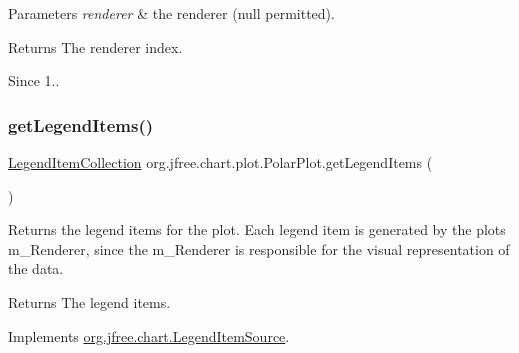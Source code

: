 \begin{DoxyParams}{Parameters}
{\em renderer} & the renderer ({\ttfamily null} permitted).\\
\hline
\end{DoxyParams}
\begin{DoxyReturn}{Returns}
The renderer index.
\end{DoxyReturn}
\begin{DoxySince}{Since}
1.. 
\end{DoxySince}
\mbox{\label{classorg_1_1jfree_1_1chart_1_1plot_1_1_polar_plot_a3581c61aafa174b1f10952d312a2c9d1}} 
\subsubsection{\texorpdfstring{get\+Legend\+Items()}{getLegendItems()}}
{\footnotesize\ttfamily \mbox{\hyperlink{classorg_1_1jfree_1_1chart_1_1_legend_item_collection}{Legend\+Item\+Collection}} org.\+jfree.\+chart.\+plot.\+Polar\+Plot.\+get\+Legend\+Items (\begin{DoxyParamCaption}{ }\end{DoxyParamCaption})}

Returns the legend items for the plot. Each legend item is generated by the plot\textquotesingle{}s m\+\_\+\+Renderer, since the m\+\_\+\+Renderer is responsible for the visual representation of the data.

\begin{DoxyReturn}{Returns}
The legend items. 
\end{DoxyReturn}


Implements \mbox{\hyperlink{interfaceorg_1_1jfree_1_1chart_1_1_legend_item_source_a224409463c4f7a8ef0e2a9df337e6d3b}{org.\+jfree.\+chart.\+Legend\+Item\+Source}}.

\mbox{\label{classorg_1_1jfree_1_1chart_1_1plot_1_1_polar_plot_a69731d97ebfbf1317432bfeb5d0bf715}} 
